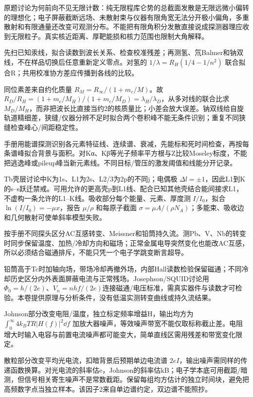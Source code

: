 原题讨论为何前向不见无限计数：纯无限程库仑势的总截面发散是无限远微小偏转的理想化；电子屏蔽截断远场、未散射束与仪器有限角宽无法分开极小偏角，多重散射和有限通量还改变可观测分布。不能把有限角积分发散直接说成探测器理应收到无限粒子。真实核近距离、厚靶能损和核力范围也限制大角解释。

先扫已知汞线，拟合读数到波长关系、检查校准残差；再测氢、氘Balmer和钠双线，不在样品切换后任意重新定义零点。对氢的 $1/\lambda=R_H(1/4-1/n^2)$ 联合拟合R；共用校准协方差应传播到各线的比较。

同位素差来自约化质量 $R_M=R_\infty/(1+m_e/M)$。故 $R_D/R_H=(1+m_e/M_H)/(1+m_e/M_D)=\lambda_H/\lambda_D$，从多对线的联合比求 $M_D/M_H$，而非把波长比直接当约2的核质量比；小差会放大误差。钠双线给自旋轨道精细差，狭缝/仪器分辨不足时拟合两个卷积峰不能无条件识别；重复不同狭缝检查峰心/间距稳定性。

手册用能谱探测识别各元素特征线、连续谱、衰减，先能标和死时间检查，再按每条谱峰拟合背景与面积。对Kα、Kβ等光子频率平方根与Z比较Moseley标度，不能把逃逸峰或pileup峰当新元素线。不同目标/管压的激发阈值和线能分开记录。

Tb壳层讨论中K为1s、L1为2s、L2/3为2p的不同j；电偶极 $\Delta l=\pm1$，因此L1到K的s--s跃迁禁戒。可用允许的更高壳p到L1线、配合已知其他壳结合能间接求L1，不虚构一条允许的L1--K线。吸收部分每个能量、元素、厚度测 $I/I_0$，拟合 $\ln(I/I_0)=-\mu x$，报告 $\mu/\rho$ 和每原子截面 $\sigma=\mu A/(\rho N_A)$；多能束、吸收边和几何散射可使单斜率模型失败。

按手册不同探头区分AC互感转变、Meissner和铅筒持久流。测Pb、V、Nb的转变时同步保留温度、加热/冷却方向和磁场；正常金属电导突然变化也能改AC互感，所以必须结合磁通排斥，不能只凭一个电子学跳变断言超导。

铅筒高于Tc时加轴向场，带场冷却再撤外场，内部Hall读数检验保留磁通；不同冷却历史区分内外表面屏蔽电流与正常残场。Josephson/SQUID讨论用 $\Phi_0=h/(2e)$、$V_n=nhf/(2e)$连接磁通/电压标准，需真实器件与读数才可检验。本卷提供原理与分析条件，没有低温实测转变曲线或持久流结果。

Johnson部分改变电阻/温度，独立标定频率增益H，输出均方为 $\int_0^\infty4k_BTR|H(f)|^2\dd f$ 加放大器噪声，等效噪声带宽不能仅取标称截止差。电阻增大时输入电容与前置电流噪声都可能变大，简单直线区需用残差和带宽变化限定。

散粒部分改变平均光电流，扣暗背景后预期单边电流谱 $2eI$，输出噪声需同样的传递函数换算。对光电流的斜率估e，Johnson的斜率估kB；电子学本底可用截距/暗测，但信号相关寄生噪声不是常数截距。保留每组均方估计的独立时间块，避免把高频数字点当独立样本。该因子2来自单边谱约定，双边谱不能照抄。

